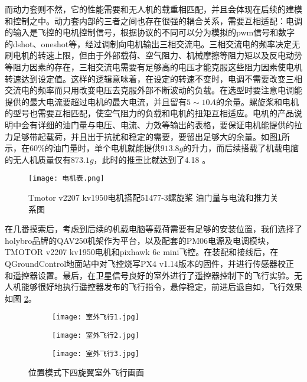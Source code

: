 而动力套则不然，它的性能需要和无人机的载重相匹配，并且会体现在后续的建模和控制之中。动力套内部的三者之间也存在很强的耦合关系，需要互相适配：电调的输入是飞控的电机控制信号，根据协议的不同可以分为模拟的pwm信号和数字的dshot、oneshot等，经过调制向电机输出三相交流电。三相交流电的频率决定无刷电机的转速上限，但由于外部载荷、空气阻力、机械摩擦等阻力矩以及反电动势等阻力因素的存在，三相交流电需要有足够高的电压才能克服这些阻力因素使电机转速达到设定值。这样的逻辑意味着，在设定的转速不变时，电调不需要改变三相交流电的频率而只用改变电压去克服外部不断波动的负载。在选型时要注意电调能提供的最大电流要超过电机的最大电流，并且留有$5\sim 10A$的余量。螺旋桨和电机的型号也需要互相匹配，使空气阻力的负载和电机的扭矩互相适应。电机的产品说明中会有详细的油门量与电压、电流、力效等输出的表格，要保证电机能提供的拉力足够带起载荷，并且出于抗扰和稳定的需要，要留出足够大的余量。如图\ref{电机表}所示，在$60 \%$的油门量时，单个电机就能提供$913.8g$的升力，而后续搭载了机载电脑的无人机质量仅有$873.1g$，此时的推重比就达到了4.18 。
\begin{figure}[!h]
  \centering
  \texttt{[image: 电机表.png]}
  \caption{Tmotor v2207 kv1950电机搭配51477-3螺旋桨 油门量与电流和推力关系图 \cite{Tmotor2023}}
  \label{电机表}
\end{figure}

在几番摸索后，考虑到后续的机载电脑等载荷需要有足够的安装位置，我们选择了holybro品牌的QAV250机架作为平台，以及配套的PM06电源及电调模块，TMOTOR v2207 kv1950电机和pixhawk 6c mini飞控。在装配和接线后，在QGroundControl地面站中对飞控烧写PX4 v1.14版本的固件，并进行传感器校正和遥控器设置。最后，在卫星信号良好的室外进行了遥控器控制下的飞行实验。无人机能够很好地执行遥控器发布的飞行指令，悬停稳定，前进后退自如，飞行效果如图 \ref{室外飞行}。
\begin{figure}[!h]
  \centering
  \begin{subfigure}[c]{0.33\textwidth}
    \centering
    \texttt{[image: 室外飞行1.jpg]}
  \end{subfigure} \hfill
  \begin{subfigure}[c]{0.33\textwidth}
    \centering
    \texttt{[image: 室外飞行2.jpg]}
  \end{subfigure}\hfill
    \begin{subfigure}[c]{0.33\textwidth}
      \centering
      \texttt{[image: 室外飞行3.jpg]}
  \end{subfigure}
  \caption{位置模式下四旋翼室外飞行画面}
  \label{室外飞行}
  \end{figure}

